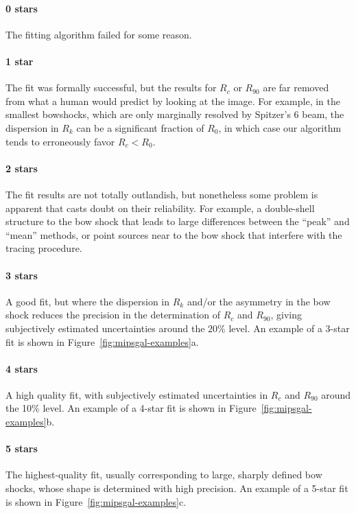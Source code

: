 \paragraph*{0 stars} The fitting algorithm failed for some reason. 

\paragraph*{1 star} The fit was formally successful, but the results
for \(R_c\) or \(R_{90}\) are far removed from what a human would
predict by looking at the image.  For example, in the smallest
bowshocks, which are only marginally resolved by Spitzer's 6\arcsec{}
beam, the dispersion in \(R_k\) can be a significant fraction of
\(R_0\), in which case our algorithm tends to erroneously favor
\(R_c < R_0\).

\paragraph*{2 stars} The fit results are not totally outlandish, but
nonetheless some problem is apparent that casts doubt on their
reliability.  For example, a double-shell structure to the bow shock
that leads to large differences between the ``peak'' and ``mean''
methods, or point sources near to the bow shock that interfere with
the tracing procedure.
  
\paragraph*{3 stars} A good fit, but where the dispersion in \(R_k\)
and/or the asymmetry in the bow shock reduces the precision in the
determination of \(R_c\) and \(R_{90}\), giving subjectively estimated
uncertainties around the 20\% level.  An example of a 3-star fit is
shown in Figure~\ref{fig:mipsgal-examples}a.

\paragraph*{4 stars} A high quality fit, with subjectively estimated
uncertainties in \(R_c\) and \(R_{90}\) around the 10\% level. An
example of a 4-star fit is shown in
Figure~\ref{fig:mipsgal-examples}b.

\paragraph*{5 stars} The highest-quality fit, usually corresponding to
large, sharply defined bow shocks, whose shape is determined with high
precision. An example of a 5-star fit is shown in
Figure~\ref{fig:mipsgal-examples}c.

